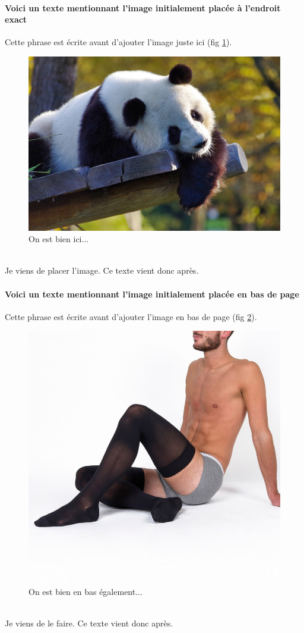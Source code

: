 \documentclass[a4paper, 13pt]{report} %
\begin{document}
		\paragraph{Voici un texte mentionnant l'image initialement placée à l'endroit exact\\}
			Cette phrase est écrite avant d'ajouter l'image juste ici (fig \ref{fig:ici2}).
			\begin{figure}\centering
				\includegraphics[width=.4\textwidth]{positions/where_i_want.jpg}
				\caption{\label{fig:ici2}On est bien ici...}
			\end{figure}
			\\Je viens de placer l'image. Ce texte vient donc après.
		\paragraph{Voici un texte mentionnant l'image initialement placée en bas de page\\}
			Cette phrase est écrite avant d'ajouter l'image en bas de page (fig \ref{fig:bas2}).
			\begin{figure}\centering
				\includegraphics[width=.35\textwidth]{positions/bas.jpg}
				\caption{\label{fig:bas2}On est bien en bas également...}
			\end{figure}
			\\Je viens de le faire. Ce texte vient donc après.
			
		\newpage
\end{document}

